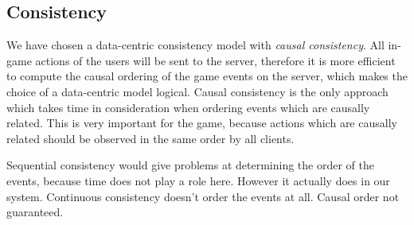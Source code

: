 \documentclass{article}
\begin{document}
\subsection{Consistency}
We have chosen a data-centric consistency model with \emph{causal consistency}.  All in-game actions of the users will be sent to the server, therefore it is more efficient to compute the causal ordering of the game events on the server, which makes the choice of a data-centric model logical.  Causal consistency is the only approach which takes time in consideration when ordering events which are causally related. This is very important for the game, because actions which are causally related should be observed in the same order by all clients. 

Sequential consistency would give problems at determining the order of the events, because time does not play a role here. However it actually does in our system. Continuous consistency doesn't order the events at all. Causal order not guaranteed.

\iffalse
\begin{itemize}
	\item The game will be server centric and not peer-to-peer.
	\item All in-game actions of the users will be sent to the server, therefore it is more efficient to compute the causal ordering of the game events on the server. 
	\item In this way the server is able to sent the ordered events to all clients. However in a peer-to-peer system, all the actions would have to be sent to all the different clients and each client would have had to compute the correct ordering of the events. 
	\item By letting the server process the incoming data of all the different clients, we take away some workload from the clients.
	\item This might even lead to inconsistency between clients as they don't know each others result. As these results might differ per client the requirement of having at least 2 redundant copies of the game log might be impossible as it is not possible to verify which client has the righteous data.
\end{itemize} 

causal consistency:
\begin{itemize}
	\item a logical choice when taking the causal actions, described by the requirements, into consideration.
	\item Sequential would give problems at determining the order of the events. Time does not play a role here. However it actually does in our system
	\item Continuous consistency doesn't order the events at all. Causal order not guaranteed.
\end{itemize}
\newpage
\fi


\newpage
\nocite{*}


\end{document}
